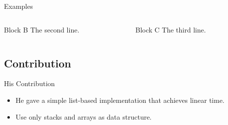 \documentclass{beamer}
\begin{document}
\begin{frame}{Examples}
	\begin{columns}
		\begin{column}{5.5cm}
			\begin{exampleblock}{Block B}
				The second line. \newline
			\end{exampleblock}
		\end{column}
		\begin{column}{5.5cm}
			\begin{exampleblock}{Block C}
				The third line. \newline
			\end{exampleblock}
		\end{column}
	\end{columns}
\end{frame}


\subsection{Contribution}

\begin{frame}{His Contribution}%

	\begin{itemize}
		\item
		He gave a simple list-based implementation that achieves linear time.
		\item
		Use only stacks and arrays as data structure. %
	\end{itemize}
\end{frame}
\end{document}
